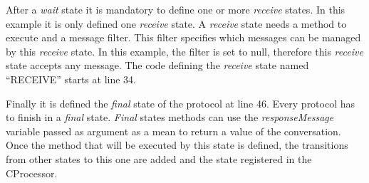 After a \textit{wait} state it is mandatory to define one or more \textit{receive} states. In this example it is only defined one \textit{receive} state. A \textit{receive} state needs a method to execute and a message filter. This filter specifies which messages can be managed by this \textit{receive} state. In this example, the filter is set to null, therefore this \textit{receive} state accepts any message. The code defining the \textit{receive} state named ``RECEIVE'' starts at line 34.

Finally it is defined the \textit{final} state of the protocol at line 46. Every protocol has to finish in a \textit{final} state. \textit{Final} states methods can use the \textit{responseMessage} variable passed as argument as a mean to return a value of the conversation. Once the method that will be executed by this state is defined, the transitions from other states to this one are added and the state registered in the CProcessor.

